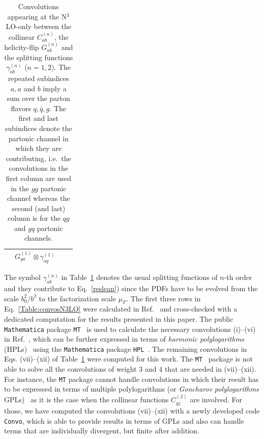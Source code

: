 \documentclass[12pt]{article}
\begin{document}
\begin{appendix}
\begin{table}
\begin{center}
\begin{tabular}{ |c|c||c|c| }
& $G^{(1)}_{ga}\otimes\gamma^{(1)}_{aq}$  \\
\hline
\end{tabular}
\caption{\label{Table:convosN3LO}
{Convolutions appearing at the N$^{3}$LO-only between the collinear $C^{(n)}_{ab}$, the helicity-flip $G^{(n)}_{ab}$ and the splitting functions $\gamma^{(n)}_{ab}$ ($n=1,2)$. The repeated subindices $a,a$ and $b$ imply a sum over the parton flavors $q,\bar{q},g$.  The first and last subindices denote the partonic channel in which they are contributing, i.e.\ the convolutions in the first column are used in the $gg$ partonic channel whereas the second (and last) column is for the $qg$ and $gq$ partonic channels.
}}
\renewcommand{\arraystretch}{1}
\end{center}
\end{table}
The symbol $\gamma_{ab}^{(n)}$ in Table~\ref{Table:convosN3LO} denotes the usual splitting functions of $n$-th order and they contribute to Eq.~\eqref{reslean}) since the PDFs have to be evolved from the scale $b_0^2/b^2$ to the factorization scale $\mu_{F}$.
The first three rows in Eq.~\eqref{Table:convosN3LO} were calculated in Ref.~\cite{Hoeschele:2012xc} and cross-checked with a dedicated computation for the results presented in this paper. The public \texttt{Mathematica} package \texttt{MT}~\cite{Hoeschele:2013gga} is used to calculate the necessary convolutions (i)--(vi) in Ref.~\cite{Hoeschele:2012xc}, which can be further expressed in terms of \textit{harmonic polylogarithms} (HPLs)~\cite{Remiddi:1999ew} using the \texttt{Mathematica} package \texttt{HPL}~\cite{Maitre:2005uu}. 
The remaining convolutions in Eqs. (vii)--(xii) of Table~\ref{Table:convosN3LO}  were computed  for this work. The \texttt{MT}~\cite{Hoeschele:2013gga} package is not able to solve all the convolutions of weight 3 and 4 that are needed in (vii)--(xii). For instance, the \texttt{MT} package cannot handle convolutions in which their result has to be expressed in terms of multiple polylogarithms (or {\em Goncharov polylogarithms} GPLs)~\cite{Goncharov:1998kja,Gehrmann:2000zt,Goncharov:2001iea} as it is the case when the collinear functions $C^{(2)}_{gj}$ are involved. For those, we have computed the convolutions (vii)--(xii) with a newly developed code \texttt{Convo}, which is able to provide results in terms of GPLs and also can handle terms that are individually divergent, but finite after addition.


\end{appendix}
\end{document}
